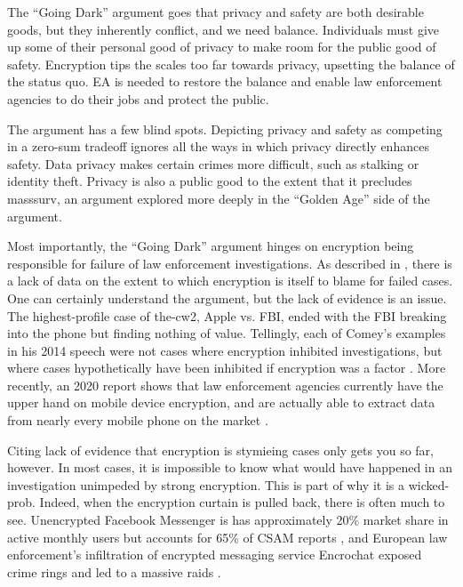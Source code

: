 The ``Going Dark'' argument goes that privacy and safety are both desirable goods, but they inherently conflict, and we
need balance. Individuals must give up some of their personal good of privacy to make room for the public good of
safety. Encryption tips the scales too far towards privacy, upsetting the balance of the status quo. \ac{EA} is needed
to restore the balance and enable law enforcement agencies to do their jobs and protect the public.

The argument has a few blind spots. Depicting privacy and safety as competing in a zero-sum tradeoff ignores all the
ways in which privacy directly enhances safety. Data privacy makes certain crimes more difficult, such as stalking or
identity theft. Privacy is also a public good to the extent that it precludes \ac{masssurv}, an argument explored more
deeply in the ``Golden Age'' side of the argument.

Most importantly, the ``Going Dark'' argument hinges on encryption being responsible for failure of law enforcement
investigations. As described in , there is a lack of data on the extent to which encryption is
itself to blame for failed cases. One can certainly understand the argument, but the lack of evidence is an issue. The
highest-profile case of \ac{the-cw2}, Apple vs. FBI, ended with the \ac{FBI} breaking into the phone but finding nothing
of value. Tellingly, each of Comey's examples in his 2014 speech were not cases where encryption inhibited
investigations, but where cases hypothetically  have been inhibited if encryption was a factor
\cite{comey_2014}. More recently, an 2020 report shows that law enforcement agencies currently have the upper hand on
mobile device encryption, and are actually able to extract data from nearly every mobile phone on the market
\cite{koepke_2020}.

Citing lack of evidence that encryption is stymieing cases only gets you so far, however. In most cases, it is
impossible to know what would have happened in an investigation unimpeded by strong encryption. This is part of why it
is a \ac{wicked-prob}. Indeed, when the encryption curtain is pulled back, there is often much to see. Unencrypted
Facebook Messenger is has approximately 20\% market share in active monthly users \cite{statista_2020} but accounts for
65\% of \ac{CSAM} reports \cite{keller_internet_2019}, and European law enforcement's infiltration of encrypted
messaging service Encrochat exposed crime rings and led to a massive raids \cite{cox_2020}.

